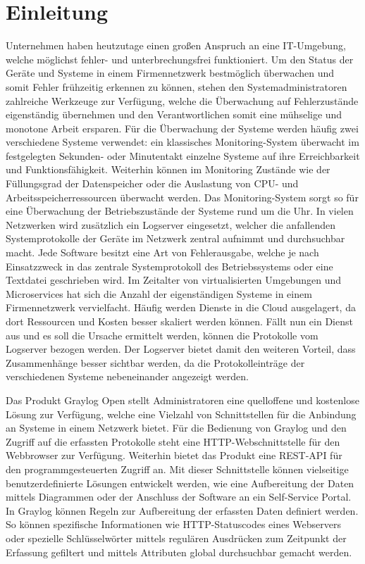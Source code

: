 \chapter{Einleitung}

Unternehmen haben heutzutage einen großen Anspruch an eine IT-Umgebung, welche möglichst fehler- und unterbrechungsfrei funktioniert. Um den Status der Geräte und Systeme in einem Firmennetzwerk bestmöglich überwachen und somit Fehler frühzeitig erkennen zu können, stehen den Systemadministratoren zahlreiche Werkzeuge zur Verfügung, welche die Überwachung auf Fehlerzustände eigenständig übernehmen und den Verantwortlichen somit eine mühselige und monotone Arbeit ersparen. Für die Überwachung der Systeme werden häufig zwei verschiedene Systeme verwendet: ein klassisches Monitoring-System überwacht im festgelegten Sekunden- oder Minutentakt einzelne Systeme auf ihre Erreichbarkeit und Funktionsfähigkeit. Weiterhin können im Monitoring Zustände wie der Füllungsgrad der Datenspeicher oder die Auslastung von CPU- und Arbeitsspeicherressourcen überwacht werden. Das Monitoring-System sorgt so für eine Überwachung der Betriebszustände der Systeme rund um die Uhr. In vielen Netzwerken wird zusätzlich ein Logserver eingesetzt, welcher die anfallenden Systemprotokolle der Geräte im Netzwerk zentral aufnimmt und durchsuchbar macht. Jede Software besitzt eine Art von Fehlerausgabe, welche je nach Einsatzzweck in das zentrale Systemprotokoll des Betriebssystems oder eine Textdatei geschrieben wird. Im Zeitalter von virtualisierten Umgebungen und Microservices hat sich die Anzahl der eigenständigen Systeme in einem Firmennetzwerk vervielfacht. Häufig werden Dienste in die Cloud ausgelagert, da dort Ressourcen und Kosten besser skaliert werden können. Fällt nun ein Dienst aus und es soll die Ursache ermittelt werden, können die Protokolle vom Logserver bezogen werden. Der Logserver bietet damit den weiteren Vorteil, dass Zusammenhänge besser sichtbar werden, da die Protokolleinträge der verschiedenen Systeme nebeneinander angezeigt werden. 

Das Produkt Graylog Open stellt Administratoren eine quelloffene und kostenlose Lösung zur Verfügung, welche eine Vielzahl von Schnittstellen für die Anbindung an Systeme in einem Netzwerk bietet. Für die Bedienung von Graylog und den Zugriff auf die erfassten Protokolle steht eine HTTP-Webschnittstelle für den Webbrowser zur Verfügung. Weiterhin bietet das Produkt eine REST-API für den programmgesteuerten Zugriff an. Mit dieser Schnittstelle können vielseitige benutzerdefinierte Lösungen entwickelt werden, wie eine Aufbereitung der Daten mittels Diagrammen oder der Anschluss der Software an ein Self-Service Portal. In Graylog können Regeln zur Aufbereitung der erfassten Daten definiert werden. So können spezifische Informationen wie HTTP-Statuscodes eines Webservers oder spezielle Schlüsselwörter mittels regulären Ausdrücken zum Zeitpunkt der Erfassung gefiltert und mittels Attributen global durchsuchbar gemacht werden.

